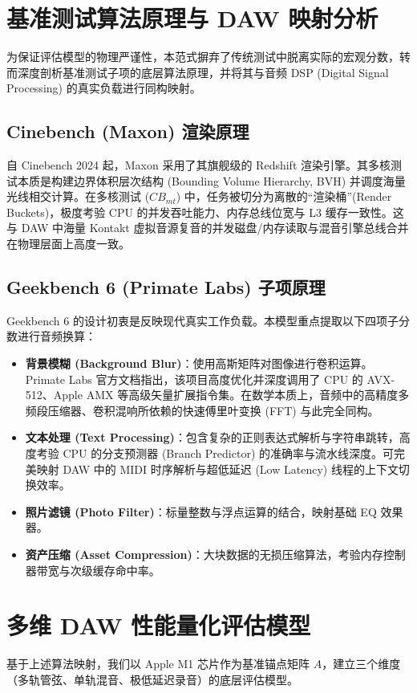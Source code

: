 \documentclass[11pt, a4paper]{article}
\begin{document}

\section{基准测试算法原理与 DAW 映射分析}
为保证评估模型的物理严谨性，本范式摒弃了传统测试中脱离实际的宏观分数，转而深度剖析基准测试子项的底层算法原理，并将其与音频 DSP (Digital Signal Processing) 的真实负载进行同构映射。

\subsection{Cinebench (Maxon) 渲染原理}
自 Cinebench 2024 起，Maxon 采用了其旗舰级的 Redshift 渲染引擎\cite{maxon2023redshift}。其多核测试本质是构建边界体积层次结构 (Bounding Volume Hierarchy, BVH) 并调度海量光线相交计算。在多核测试 ($CB_{mt}$) 中，任务被切分为离散的“渲染桶”(Render Buckets)，极度考验 CPU 的并发吞吐能力、内存总线位宽与 L3 缓存一致性。这与 DAW 中海量 Kontakt 虚拟音源复音的并发磁盘/内存读取与混音引擎总线合并在物理层面上高度一致。

\subsection{Geekbench 6 (Primate Labs) 子项原理}
Geekbench 6 的设计初衷是反映现代真实工作负载\cite{poole2023geekbench}。本模型重点提取以下四项子分数进行音频换算：
\begin{itemize}
    \item \textbf{背景模糊 (Background Blur)}：使用高斯矩阵对图像进行卷积运算。Primate Labs 官方文档指出，该项目高度优化并深度调用了 CPU 的 AVX-512、Apple AMX 等高级矢量扩展指令集。在数学本质上，音频中的高精度多频段压缩器、卷积混响所依赖的快速傅里叶变换 (FFT) 与此完全同构。
    \item \textbf{文本处理 (Text Processing)}：包含复杂的正则表达式解析与字符串跳转，高度考验 CPU 的分支预测器 (Branch Predictor) 的准确率与流水线深度。可完美映射 DAW 中的 MIDI 时序解析与超低延迟 (Low Latency) 线程的上下文切换效率。
    \item \textbf{照片滤镜 (Photo Filter)}：标量整数与浮点运算的结合，映射基础 EQ 效果器。
    \item \textbf{资产压缩 (Asset Compression)}：大块数据的无损压缩算法，考验内存控制器带宽与次级缓存命中率。
\end{itemize}

\section{多维 DAW 性能量化评估模型}
基于上述算法映射，我们以 Apple M1 芯片作为基准锚点矩阵 $A$，建立三个维度（多轨管弦、单轨混音、极低延迟录音）的底层评估模型。
\end{document}
